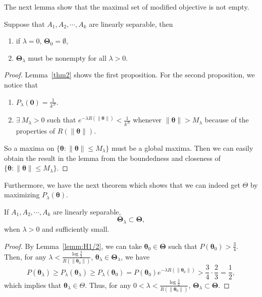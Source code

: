 The next lemma show that the maximal set of modified objective is not empty.
\begin{lemma}Suppose that $A_1,A_2, \cdots, A_k$ are linearly separable, then
	\begin{enumerate}
		\item if $\lambda = 0$, $\bm\Theta_0 = \emptyset$,
		\item $\bm\Theta_{\lambda}$ must be nonempty for all $\lambda>0$.
	\end{enumerate}
\end{lemma}
\begin{proof}
	Lemma~\ref{thm2} shows the first proposition. For the second proposition, 
	we notice that 
	\begin{enumerate}
		\item $ P_\lambda(\bm 0) = \frac{1}{k^N}$.
		\item $\exists\ M_{\lambda}>0$ such that $e^{-\lambda R(\|\bm\theta\|)}<\frac{1}{k^N}$ whenever $\|\bm\theta\|> M_{\lambda}$ because of the properties of $R(\|\bm\theta\|)$.
	\end{enumerate}
	So a maxima on $\{\bm\theta: \|\bm\theta\| \le M_{\lambda}\}$ must be a global maxima. Then we can easily obtain the result in the lemma from the boundedness and closeness of $\{\bm\theta: \|\bm\theta\| \le M_{\lambda}\}$.
\end{proof}

Furthermore, we have the next theorem which shows that we can indeed get $\Theta$ by maximizing $P_\lambda(\bm \theta)$.
\begin{theorem}\label{thm-L-Theta} If $A_1,A_2,\cdots,A_k$ are linearly separable, 
	\begin{equation}\label{key}
	\bm\Theta_{\lambda} \subset \bm\Theta,
	\end{equation}
when $\lambda>0$ and sufficiently small.
\end{theorem}
\begin{proof}
By Lemma~\ref{lemm:H1/2}, we can take $\bm\theta_0\in \bm\Theta$ such that $P(\bm\theta_0)> \frac{3}{4}$.
Then, for any $\lambda < \frac{\log \frac{3}{2}}{R(\|\bm\theta_0\|)}$, $\bm\theta_{\lambda}\in \bm\Theta_{\lambda}$, we have
		\[
		P(\bm\theta_{\lambda}) \geq  P_\lambda(\bm\theta_{\lambda})  \geq P_\lambda(\bm \theta_0) = P(\bm\theta_0)e^{-\lambda R(\|\bm\theta_0\|)} > \frac{3}{4}\cdot \frac{2}{3} = \frac{1}{2},
		\]
		which implies that $\bm \theta_{\lambda} \in \Theta$.
		Thus, for any $ 0< \lambda < \frac{\log \frac{3}{2}}{R(\|\bm\theta_0\|)}$, $\bm\Theta_{\lambda} \subset \bm\Theta$.

\end{proof}


